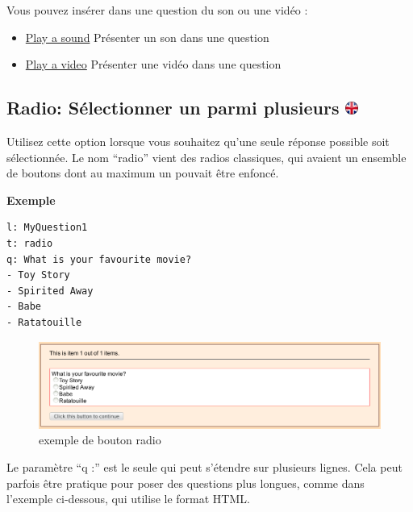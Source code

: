 \documentclass[
]{book}
\providecommand{\tightlist}{%
  \setlength{\itemsep}{0pt}\setlength{\parskip}{0pt}}
\begin{document}
Vous pouvez insérer dans une question du son ou une vidéo :

\begin{itemize}
\tightlist
\item
  \protect\hyperlink{survey_playasound}{Play a sound} Présenter un son dans une question
\item
  \protect\hyperlink{survey_playavideo}{Play a video} Présenter une vidéo dans une question
\end{itemize}

\hypertarget{radio-suxe9lectionner-un-parmi-plusieurs}{%
\subsection[Radio: Sélectionner un parmi plusieurs ]{\texorpdfstring{Radio: Sélectionner un parmi plusieurs \href{https://www.psytoolkit.org/doc3.4.0/online-survey-syntax.html\#radio}{\protect\includegraphics{img/ukflag.png}}}{Radio: Sélectionner un parmi plusieurs }}\label{radio-suxe9lectionner-un-parmi-plusieurs}}

Utilisez cette option lorsque vous souhaitez qu'une seule réponse possible soit sélectionnée. Le nom ``radio'' vient des radios classiques, qui avaient un ensemble de boutons dont au maximum un pouvait être enfoncé.

\textbf{Exemple}

\begin{verbatim}
l: MyQuestion1
t: radio
q: What is your favourite movie?
- Toy Story
- Spirited Away
- Babe
- Ratatouille
\end{verbatim}

\begin{figure}
\centering
\includegraphics{img/question1.png}
\caption{exemple de bouton radio}
\end{figure}

Le paramètre ``q :'' est le seule qui peut s'étendre sur plusieurs lignes. Cela peut parfois être pratique pour poser des questions plus longues, comme dans l'exemple ci-dessous, qui utilise le format HTML.
\end{document}
